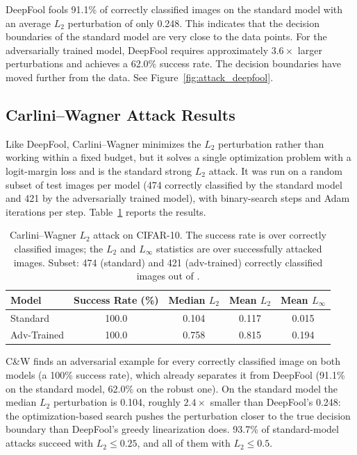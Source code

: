 DeepFool fools 91.1\% of correctly classified images on the standard model with an average $L_2$ perturbation of only 0.248. This indicates that the decision boundaries of the standard model are very close to the data points. For the adversarially trained model, DeepFool requires approximately $3.6\times$ larger perturbations and achieves a 62.0\% success rate. The decision boundaries have moved further from the data. See Figure~\ref{fig:attack_deepfool}.

\subsection{Carlini--Wagner Attack Results}
\label{sec:cw_results}

Like DeepFool, Carlini--Wagner minimizes the $L_2$ perturbation rather than working within a fixed budget, but it solves a single optimization problem with a logit-margin loss and is the standard strong $L_2$ attack. It was run on a random subset of \CWN{} test images per model (474 correctly classified by the standard model and 421 by the adversarially trained model), with \CWS{} binary-search steps and \CWI{} Adam iterations per step. Table~\ref{tab:cw_results} reports the results.

\begin{table}[htbp]
    \centering
    \caption{Carlini--Wagner $L_2$ attack on CIFAR-10. The success rate is over correctly classified images; the $L_2$ and $L_\infty$ statistics are over successfully attacked images. Subset: 474 (standard) and 421 (adv-trained) correctly classified images out of \CWN{}.}
    \label{tab:cw_results}
    \begin{tabular}{lcccc}
        \toprule
        \textbf{Model} & \textbf{Success Rate (\%)} & \textbf{Median $L_2$} & \textbf{Mean $L_2$} & \textbf{Mean $L_\infty$} \\
        \midrule
        Standard & 100.0 & 0.104 & 0.117 & 0.015 \\
        Adv-Trained & 100.0 & 0.758 & 0.815 & 0.194 \\
        \bottomrule
    \end{tabular}
\end{table}

C\&W finds an adversarial example for every correctly classified image on both models (a 100\% success rate), which already separates it from DeepFool (91.1\% on the standard model, 62.0\% on the robust one). On the standard model the median $L_2$ perturbation is 0.104, roughly $2.4\times$ smaller than DeepFool's 0.248: the optimization-based search pushes the perturbation closer to the true decision boundary than DeepFool's greedy linearization does. 93.7\% of standard-model attacks succeed with $L_2 \le 0.25$, and all of them with $L_2 \le 0.5$.

